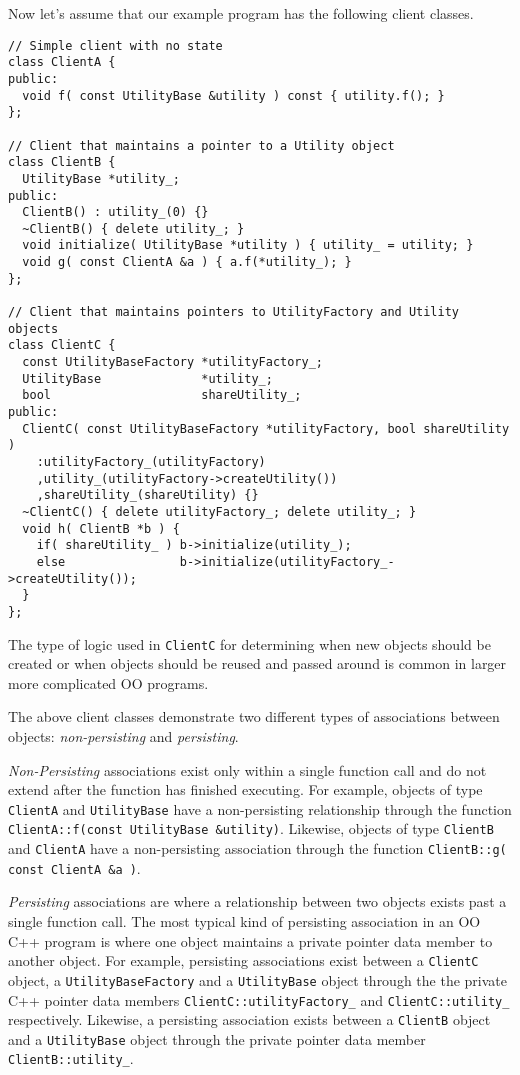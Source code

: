 \documentclass[pdf,ps2pdf,11pt]{SANDreport}
\begin{document}
Now let's assume that our example program has the following client
classes.

{\small\begin{verbatim}
// Simple client with no state
class ClientA {
public:
  void f( const UtilityBase &utility ) const { utility.f(); }
};

// Client that maintains a pointer to a Utility object 
class ClientB {
  UtilityBase *utility_;
public:
  ClientB() : utility_(0) {}
  ~ClientB() { delete utility_; }
  void initialize( UtilityBase *utility ) { utility_ = utility; }
  void g( const ClientA &a ) { a.f(*utility_); }
};

// Client that maintains pointers to UtilityFactory and Utility objects
class ClientC {
  const UtilityBaseFactory *utilityFactory_;
  UtilityBase              *utility_;
  bool                     shareUtility_;
public:
  ClientC( const UtilityBaseFactory *utilityFactory, bool shareUtility )
    :utilityFactory_(utilityFactory)
    ,utility_(utilityFactory->createUtility())
    ,shareUtility_(shareUtility) {}
  ~ClientC() { delete utilityFactory_; delete utility_; }
  void h( ClientB *b ) {
    if( shareUtility_ ) b->initialize(utility_);
    else                b->initialize(utilityFactory_->createUtility());
  }
};
\end{verbatim}}

The type of logic used in {}\texttt{ClientC} for determining when new
objects should be created or when objects should be reused and passed
around is common in larger more complicated OO programs.

The above client classes demonstrate two different types of
associations between objects: {}\textit{non-persisting} and
{}\textit{persisting}.

{}\textit{Non-Persisting}\label{rcp:non-persisting-defined}
associations exist only within a single function call and do not
extend after the function has finished executing.  For example,
objects of type {}\texttt{Client\-A} and {}\texttt{Utility\-Base} have
a non-persisting relationship through the function
{}\texttt{ClientA\-::f(const UtilityBase \&utility)}.  Likewise,
objects of type {}\texttt{Client\-B} and {}\texttt{Client\-A} have a
non-persisting association through the function
{}\texttt{ClientB\-::g( const ClientA
\&a )}.

{}\textit{Persisting}\label{rcp:persisting-defined} associations are
where a relationship between two objects exists past a single function
call.  The most typical kind of persisting association in an OO C++
program is where one object maintains a private pointer data member to
another object.  For example, persisting associations exist between a
{}\texttt{ClientC} object, a {}\texttt{Utility\-Base\-Factory} and a
{}\texttt{Utility\-Base} object through the the private C++ pointer
data members {}\texttt{ClientC\-::utility\-Factory\_} and
{}\texttt{ClientC\-::utility\_} respectively.  Likewise, a persisting
association exists between a {}\texttt{ClientB} object and a
{}\texttt{Utility\-Base} object through the private pointer data
member {}\texttt{ClientB\-::utility\_}.
\end{document}
